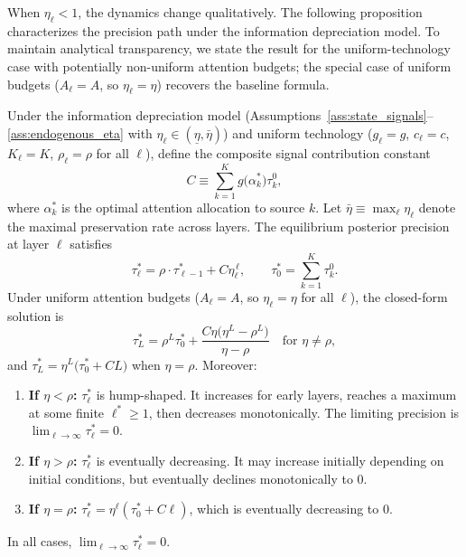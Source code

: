 When $\eta_\ell < 1$, the dynamics change qualitatively. The following proposition characterizes the precision path under the information depreciation model. To maintain analytical transparency, we state the result for the uniform-technology case with potentially non-uniform attention budgets; the special case of uniform budgets ($A_\ell = A$, so $\eta_\ell = \eta$) recovers the baseline formula.

\begin{proposition}\label{prop:precision_path}
Under the information depreciation model (Assumptions~\ref{ass:state_signals}--\ref{ass:endogenous_eta} with $\eta_\ell \in (\underline{\eta}, \bar{\eta})$) and uniform technology ($g_\ell = g$, $c_\ell = c$, $K_\ell = K$, $\rho_\ell = \rho$ for all $\ell$), define the composite signal contribution constant
\begin{equation}\label{eq:C_constant}
C \equiv \sum_{k=1}^{K} g\bigl(\alpha^{*}_{k}\bigr) \tau^{0}_{k},
\end{equation}
where $\alpha^{*}_{k}$ is the optimal attention allocation to source $k$. Let $\bar{\eta} \equiv \max_\ell \eta_\ell$ denote the maximal preservation rate across layers. The equilibrium posterior precision at layer $\ell$ satisfies
\begin{equation}\label{eq:recursive_tau_unified}
\tau^{*}_{\ell} = \rho \cdot \tau^{*}_{\ell-1} + C \eta_\ell^{\,\ell}, \qquad \tau^{*}_{0} = \sum_{k=1}^{K} \tau^{0}_{k}.
\end{equation}
Under uniform attention budgets ($A_\ell = A$, so $\eta_\ell = \eta$ for all $\ell$), the closed-form solution is
\begin{equation}\label{eq:tau_star_L}
\tau^{*}_{L} = \rho^{L} \tau^{*}_{0} + \frac{C\eta\bigl(\eta^{L} - \rho^{L}\bigr)}{\eta - \rho} \quad \text{for } \eta \neq \rho,
\end{equation}
and $\tau^{*}_{L} = \eta^{L}\bigl(\tau^{*}_{0} + CL\bigr)$ when $\eta = \rho$. Moreover:

\begin{enumerate}[label=(\roman*)]
\item \textbf{If $\eta < \rho$:} $\tau^{*}_{\ell}$ is hump-shaped. It increases for early layers, reaches a maximum at some finite $\ell^{*} \geq 1$, then decreases monotonically. The limiting precision is $\lim_{\ell \to \infty} \tau^{*}_{\ell} = 0$.

\item \textbf{If $\eta > \rho$:} $\tau^{*}_{\ell}$ is eventually decreasing. It may increase initially depending on initial conditions, but eventually declines monotonically to $0$.

\item \textbf{If $\eta = \rho$:} $\tau^{*}_{\ell} = \eta^{\ell}(\tau^{*}_{0} + C\ell)$, which is eventually decreasing to $0$.
\end{enumerate}
In all cases, $\lim_{\ell \to \infty} \tau^{*}_{\ell} = 0$.
\label{prop:geometric_decay}%
\end{proposition}

